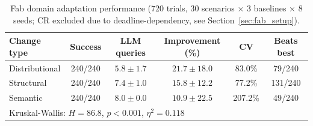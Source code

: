 \begin{table}[h]
\centering
\caption{Fab domain adaptation performance (720 trials, 30 scenarios $\times$ 3 baselines $\times$ 8 seeds; CR excluded due to deadline-dependency, see Section~\ref{sec:fab_setup}).}
\label{tab:fab_summary}
\small
\begin{tabular}{@{}lccccc@{}}
\toprule
Change type & Success & LLM queries & Improvement (\%) & CV & Beats best \\
\midrule
Distributional & 240/240 & $5.8\pm1.7$ & $21.7\pm18.0$ & 83.0\% & 79/240 \\
Structural & 240/240 & $7.4\pm1.0$ & $15.8\pm12.2$ & 77.2\% & 131/240 \\
Semantic & 240/240 & $8.0\pm0.0$ & $10.9\pm22.5$ & 207.2\% & 49/240 \\
\midrule
\multicolumn{6}{l}{\footnotesize Kruskal-Wallis: $H=86.8$, $p<0.001$, $\eta^2=0.118$} \\
\bottomrule
\end{tabular}
\end{table}